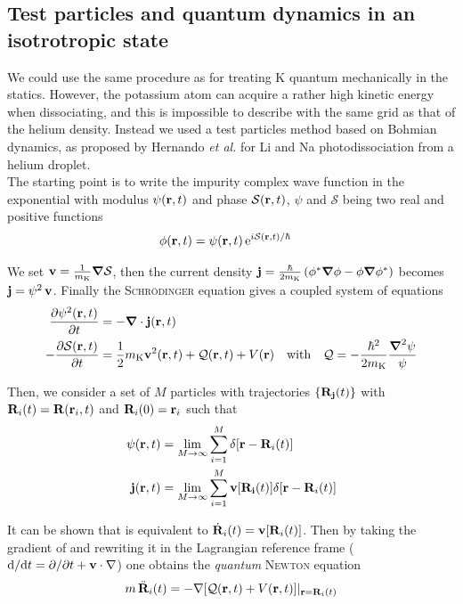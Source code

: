 \subsection{Test particles and quantum dynamics in an isotrotropic state}

We could use the same procedure as for treating K quantum mechanically in the statics. However, the potassium atom can acquire a rather high kinetic energy when dissociating, and this is impossible to describe with the same grid as that of the helium density.
Instead we used a test particles method based on Bohmian dynamics, as proposed by Hernando \textit{et al.} \cite{Her2012} for Li and Na photodissociation from a helium droplet. \\

The starting point is to write the impurity complex wave function in the exponential with modulus $\psi(\vb{r},t)$ and phase $\mathcal{S}(\vb{r},t)$, $\psi$ and $\mathcal{S}$ being two real and positive functions
\begin{align}
\phi(\vb{r},t) &= \psi(\vb{r},t)\, \mathrm{e}^{i\mathcal{S}(\vb{r},t)/\hbar} 
\end{align}

We set $\vb{v}= \frac{1}{m_{\mathrm{K}}} \grad{} \mathcal{S}$, then the current density $\vb{j} = \frac{\hbar}{2m_{\mathrm{K}}} \left(\phi^* \grad{} \phi - \phi \grad \phi^* \right)$ becomes $\vb{j} = \psi^2 \, \vb{v}$. Finally the \textsc{Schrödinger} equation gives a coupled system of equations
\begin{align}
\pdv{\psi^2(\vb{r},t)}{t} &= - \grad{} \cdot \vb{j}(\vb{r},t) \label{eq:TDDFT-cont} \\
- \pdv{\mathcal{S}(\vb{r},t)}{t} &= \frac{1}{2} m_{\mathrm{K}} \vb{v}^2(\vb{r},t) + \mathcal{Q}(\vb{r},t) + V(\vb{r}) \quad \text{with} \quad \mathcal{Q} = -\frac{\hbar^2}{2m_{\mathrm{K}}} \frac{\grad{}^2 \psi}{\psi} \label{eq:TDDFT-HJ} 
\end{align}

Then, we consider a set of $M$ particles with trajectories $\{\vb{R_j}(t)\}$ with $\vb{R}_i(t)=\vb{R}(\vb{r}_i,t)$ and $\vb{R}_i(0)=\vb{r}_i$ such that
\begin{align}
\psi(\vb{r},t)&=\underset{M \rightarrow \infty}{\text{lim}}\sum_{i=1}^M \delta [\vb{r}-\vb{R}_i(t)] \\
\vb{j}(\vb{r},t)&=\underset{M \rightarrow \infty}{\text{lim}}\sum_{i=1}^M \vb{v}[\vb{R_i}(t)]\delta [\vb{r}-\vb{R}_i(t)]
\end{align}

It can be shown \cite{DFTguide} that  is equivalent to $\dot{\vb{R}}_i(t) = \vb{v}[\vb{R}_i(t)]$. Then by taking the gradient of  and rewriting it in the Lagrangian reference frame ($\mathrm{d}/\mathrm{d}t = \partial/\partial t + \vb{v} \cdot \vb{\nabla{}}$) one obtains the \textit{quantum} \textsc{Newton} equation
\begin{align}
m\, \ddot{\vb{R}}_i(t) = - \nabla[\mathcal{Q}(\vb{r},t)+V(\vb{r},t)]|_{\vb{r}=\vb{R}_i(t)}
\end{align}

